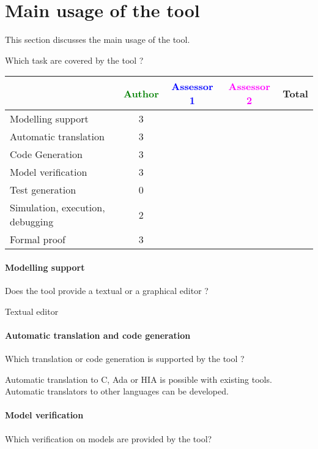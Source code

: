 \section{Main usage of the tool}
\label{main_usage}

This section discusses the main usage of the tool.

Which task are covered by the tool ?


\begin{tabular}{|l | c | c | c | c|}
\hline
& \textcolor{green}{Author} & \textcolor{blue}{Assessor 1} & \textcolor{magenta}{Assessor 2} & Total \\
\hline 
Modelling support & 3 & & &  \\
\hline
Automatic translation  & 3 & & & \\
\hline
Code Generation  & 3 & & & \\
\hline
Model verification & 3 & & & \\
\hline
Test generation & 0 & & & \\
\hline
Simulation, execution, debugging & 2  & & & \\
\hline
Formal proof & 3 & & & \\
\hline
\end{tabular}

\paragraph{Modelling support}
Does the tool provide a  textual or a graphical editor ?

\begin{author_comment}
Textual editor
\end{author_comment}

\paragraph{Automatic translation and code generation}
Which translation or code generation is supported by the tool ?

\begin{author_comment}
Automatic translation to  C, Ada or HIA is possible with existing tools. Automatic translators to other languages can be developed.
\end{author_comment}

\paragraph{Model verification}
Which verification on models are provided by the tool?

